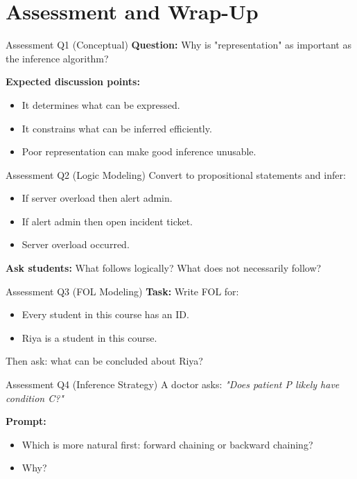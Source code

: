 \documentclass[10pt]{beamer}
\begin{document}
\section{Assessment and Wrap-Up}

\begin{frame}{Assessment Q1 (Conceptual)}
    \textbf{Question:} Why is "representation" as important as the inference algorithm?

    \vspace{0.2cm}
    \textbf{Expected discussion points:}
    \begin{itemize}
        \item It determines what can be expressed.
        \item It constrains what can be inferred efficiently.
        \item Poor representation can make good inference unusable.
    \end{itemize}
\end{frame}

\begin{frame}{Assessment Q2 (Logic Modeling)}
    Convert to propositional statements and infer:
    \begin{itemize}
        \item If server overload then alert admin.
        \item If alert admin then open incident ticket.
        \item Server overload occurred.
    \end{itemize}
    \vspace{0.2cm}
    \textbf{Ask students:} What follows logically? What does not necessarily follow?
\end{frame}

\begin{frame}{Assessment Q3 (FOL Modeling)}
    \textbf{Task:} Write FOL for:
    \begin{itemize}
        \item Every student in this course has an ID.
        \item Riya is a student in this course.
    \end{itemize}
    \vspace{0.2cm}
    Then ask: what can be concluded about Riya?
\end{frame}

\begin{frame}{Assessment Q4 (Inference Strategy)}
    A doctor asks: \textit{"Does patient P likely have condition C?"}

    \vspace{0.2cm}
    \textbf{Prompt:}
    \begin{itemize}
        \item Which is more natural first: forward chaining or backward chaining?
        \item Why?
    \end{itemize}
\end{frame}
\end{document}
